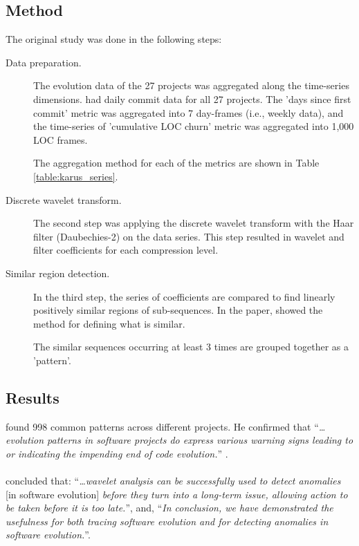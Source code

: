 \subsection{Method}
The original study was done in the following steps:
\begin{description}
	\item[Data preparation.] The evolution data of the 27 projects was aggregated
		along the time-series dimensions. \citeauthor{karus2013} had daily commit
		data for all 27 projects. The 'days since first commit' metric was aggregated
		into 7 day-frames (i.e., weekly data), and the time-series of 'cumulative LOC
		churn' metric was aggregated into 1,000 LOC frames.
		
		The aggregation method for each of the metrics are shown in Table
		\ref{table:karus_series}.
		
	\item[Discrete wavelet transform.] The second step was applying the discrete
		wavelet transform with the Haar filter (Daubechies-2) on the data series.
		This step resulted in wavelet and filter coefficients for each compression
		level.
		
	\item[Similar region detection.] In the third step, the series of coefficients
		are compared to find linearly positively similar regions of sub-sequences. In
		the paper, \citet{karus2013} showed the method for defining what is similar.

		The similar sequences occurring at least 3 times are grouped together as a
		'pattern'.
\end{description}

\subsection{Results}
\citeauthor{karus2013} found 998 common patterns across different projects. He
confirmed that ``\emph{\ldots{}evolution patterns in software projects do
express various warning signs leading to or indicating the impending end of
code evolution.}\rm'' \cite{karus2013}.

\paragraph{}
\citet{karus2013} concluded that: ``\emph{\ldots{}wavelet analysis can be
successfully used to detect anomalies }\rm [in software evolution] \emph{before
they turn into a long-term issue, allowing action to be taken before it is too
late.}\rm'', and, ``\emph{In conclusion, we have demonstrated the usefulness
for both tracing software evolution and for detecting anomalies in software
evolution.}\rm''.


